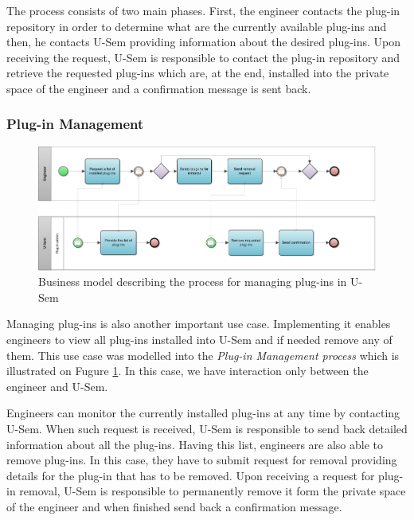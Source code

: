 The process consists of two main phases. First, the engineer contacts the plug-in repository in order to determine what are the currently available plug-ins and then, he contacts U-Sem providing information about the desired plug-ins. Upon receiving the request, U-Sem is responsible to contact the plug-in repository and retrieve the requested plug-ins which are, at the end, installed into the private space of the engineer and a confirmation message is sent back.

\subsubsection{Plug-in Management}

\begin{figure}[h!]
  \centering
  	\includegraphics[scale=0.75,angle=270]{plug-in/business_processes/PluginManagementBusinessModel.jpg}
  \caption{Business model describing the process for managing plug-ins in U-Sem}
  \label{fig_admin_bpm}
\end{figure}

Managing plug-ins is also another important use case. Implementing it enables engineers to view all plug-ins installed into U-Sem and if needed remove any of them. This use case was modelled into the \textit{Plug-in Management process} which is illustrated on Fugure \ref{fig_admin_bpm}. In this case, we have interaction only between the engineer and U-Sem.

Engineers can monitor the currently installed plug-ins at any time by contacting U-Sem. When such request is received, U-Sem is responsible to send back detailed information about all the plug-ins. Having this list, engineers are also able to remove plug-ins. In this case, they have to submit request for removal providing details for the plug-in that has to be removed. Upon receiving a request for plug-in removal, U-Sem is responsible to permanently remove it form the private space of the engineer and when finished send back a confirmation message.


